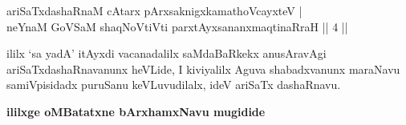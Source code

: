 \begin{shl}
ariSaTxdashaRnaM cAtarx pArxsaknigxkamathoVcayxteV | \\
neYnaM GoVSaM shaqNoVtiVti parxtAyxsananxmaqtinaRraH \hfill ||  4 || 
\end{shl}

\begin{artha}
ililx `sa yadA' itAyxdi vacanadalilx saMdaBaRkekx anusAravAgi ariSaTxdashaRnavanunx heVLide, I kiviyalilx Aguva shabadxvanunx maraNavu samiVpisidadx puruSanu keVLuvudilalx, ideV ariSaTx dashaRnavu.
\end{artha}

\begin{center}
{\bf ililxge oMBatatxne bArxhamxNavu mugidide}

\end{center}
